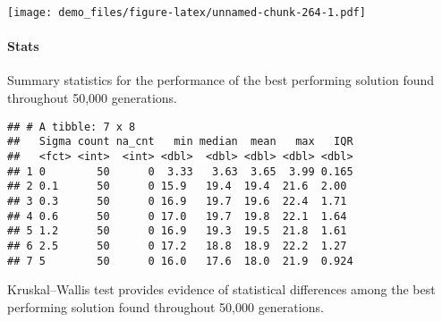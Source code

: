 \documentclass[]{book}
\newenvironment{Shaded}{\begin{snugshade}}{\end{snugshade}}
\newcommand{\DataTypeTok}[1]{\textcolor[rgb]{0.13,0.29,0.53}{#1}}
\newcommand{\KeywordTok}[1]{\textcolor[rgb]{0.13,0.29,0.53}{\textbf{#1}}}
\newcommand{\NormalTok}[1]{#1}
\newcommand{\OperatorTok}[1]{\textcolor[rgb]{0.81,0.36,0.00}{\textbf{#1}}}
\newcommand{\OtherTok}[1]{\textcolor[rgb]{0.56,0.35,0.01}{#1}}
\newcommand{\StringTok}[1]{\textcolor[rgb]{0.31,0.60,0.02}{#1}}
\let\oldparagraph\paragraph
\renewcommand{\paragraph}[1]{\oldparagraph{#1}\mbox{}}
\begin{document}
\texttt{[image: demo\_files/figure-latex/unnamed-chunk-264-1.pdf]}

\hypertarget{stats-50}{%
\paragraph{Stats}\label{stats-50}}

Summary statistics for the performance of the best performing solution found throughout 50,000 generations.

\begin{Shaded}
\end{Shaded}

\begin{verbatim}
## # A tibble: 7 x 8
##   Sigma count na_cnt   min median  mean   max   IQR
##   <fct> <int>  <int> <dbl>  <dbl> <dbl> <dbl> <dbl>
## 1 0        50      0  3.33   3.63  3.65  3.99 0.165
## 2 0.1      50      0 15.9   19.4  19.4  21.6  2.00 
## 3 0.3      50      0 16.9   19.7  19.6  22.4  1.71 
## 4 0.6      50      0 17.0   19.7  19.8  22.1  1.64 
## 5 1.2      50      0 16.9   19.3  19.5  21.8  1.61 
## 6 2.5      50      0 17.2   18.8  18.9  22.2  1.27 
## 7 5        50      0 16.0   17.6  18.0  21.9  0.924
\end{verbatim}

Kruskal--Wallis test provides evidence of statistical differences among the best performing solution found throughout 50,000 generations.
\end{document}
